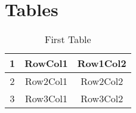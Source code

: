 \chapter{Tables}

	\begin{table}[ht]
		\centering
		\begin{tabular}{|c|c|c|}
		\hline
		\hline
		1 & RowCol1 & Row1Col2 \\
		\hline
		2 & Row2Col1 & Row2Col2 \\
		\hline
		3 & Row3Col1 & Row3Col2 \\
		\hline
		\end{tabular}
		\caption{First Table}
		\label{tab:firstTable}
	\end{table}